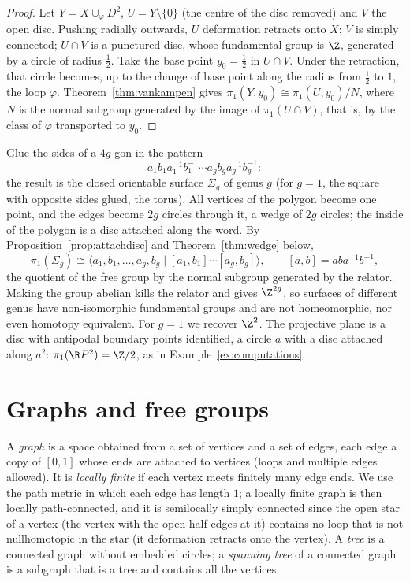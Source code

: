 \begin{proof}
Let $Y=X\cup_\varphi D^2$, $U=Y\setminus\{0\}$ (the centre of the disc removed) and $V$ the open disc. Pushing radially outwards, $U$ deformation retracts onto $X$; $V$ is simply connected;
$U\cap V$ is a punctured disc, whose fundamental group is $\Z$, generated by a circle of radius $\frac12$. Take the base point $y_0=\frac12$ in $U\cap V$. Under the retraction, that circle becomes,
up to the change of base point along the radius from $\frac12$ to $1$, the loop $\varphi$. Theorem~\ref{thm:vankampen} gives $\pi_1(Y,y_0)\cong\pi_1(U,y_0)/N$, where $N$ is the normal subgroup generated by
the image of $\pi_1(U\cap V)$, that is, by the class of $\varphi$ transported to $y_0$.
\end{proof}

\begin{example}\label{ex:surfaces}
Glue the sides of a $4g$-gon in the pattern
\[a_1b_1a_1^{-1}b_1^{-1}\cdots a_gb_ga_g^{-1}b_g^{-1}:\]
the result is the closed orientable surface $\Sigma_g$ of genus $g$ (for $g=1$, the square with opposite
sides glued, the torus). All vertices of the polygon become one point, and the edges become $2g$ circles through it, a wedge of $2g$ circles; the inside of the polygon is a disc attached along
the word. By Proposition~\ref{prop:attachdisc} and Theorem~\ref{thm:wedge} below,
\[\pi_1(\Sigma_g)\cong\bigl\langle a_1,b_1,\dots,a_g,b_g\mid[a_1,b_1]\cdots[a_g,b_g]\bigr\rangle,\qquad[a,b]=aba^{-1}b^{-1},\]
the quotient of the free group by the normal subgroup generated by the relator. Making the group abelian kills the relator and gives $\Z^{2g}$, so surfaces of different genus have
non-isomorphic fundamental groups and are not homeomorphic, nor even homotopy equivalent. For $g=1$ we recover $\Z^2$. The projective plane is a disc with antipodal boundary points identified,
a circle $a$ with a disc attached along $a^2$: $\pi_1(\R P^2)=\Z/2$, as in Example~\ref{ex:computations}.
\end{example}

\section{Graphs and free groups}\label{sec:graphs}

A \emph{graph} is a space obtained from a set of vertices and a set of edges, each edge a copy of $[0,1]$ whose ends are attached to vertices (loops and multiple edges allowed). It is
\emph{locally finite} if each vertex meets finitely many edge ends. We use the path metric in which each edge has length $1$; a locally finite graph is then locally path-connected, and it is
semilocally simply connected since the open star of a vertex (the vertex with the open half-edges at it) contains no loop that is not nullhomotopic in the star (it deformation retracts onto
the vertex). A \emph{tree} is a connected graph without embedded circles; a \emph{spanning tree} of a connected graph is a subgraph that is a tree and contains all the vertices.

